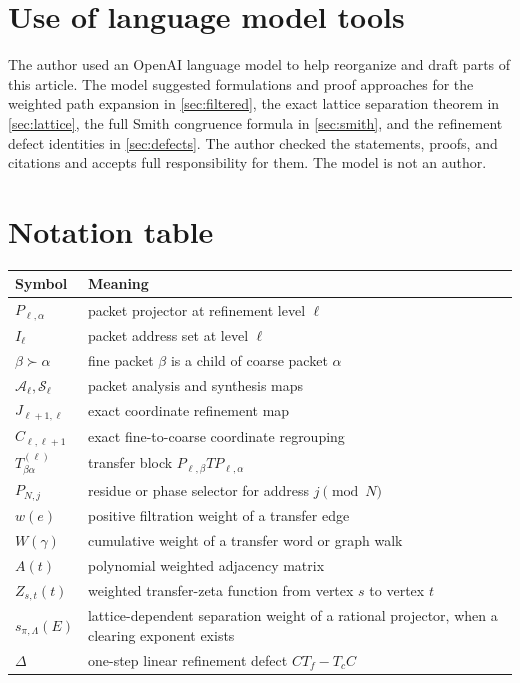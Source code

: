 \documentclass[11pt,a4paper]{article}
\theoremstyle{definition}
\theoremstyle{remark}
\providecommand{\cA}{\mathcal A}
\providecommand{\cS}{\mathcal S}
\theoremstyle{definition}\newtheorem{construction}[theorem]{Construction}\newtheorem{certificate}[theorem]{Numerical Certificate}
\theoremstyle{remark}\newtheorem{boundary}[theorem]{Boundary}
\begin{document}
\section*{Use of language model tools}

The author used an OpenAI language model to help reorganize and draft parts of this article.  The model suggested formulations and proof approaches for the weighted path expansion in \cref{sec:filtered}, the exact lattice separation theorem in \cref{sec:lattice}, the full Smith congruence formula in \cref{sec:smith}, and the refinement defect identities in \cref{sec:defects}.  The author checked the statements, proofs, and citations and accepts full responsibility for them.  The model is not an author.


\appendix
\section{Notation table}

\begin{longtable}{L{0.28\textwidth}L{0.64\textwidth}}
\toprule
Symbol & Meaning \\
\midrule
\endhead
$P_{\ell,\alpha}$ & packet projector at refinement level $\ell$ \\
$I_\ell$ & packet address set at level $\ell$ \\
$\beta\succ\alpha$ & fine packet $\beta$ is a child of coarse packet $\alpha$ \\
$\cA_\ell,\cS_\ell$ & packet analysis and synthesis maps \\
$J_{\ell+1,\ell}$ & exact coordinate refinement map \\
$C_{\ell,\ell+1}$ & exact fine-to-coarse coordinate regrouping \\
$T^{(\ell)}_{\beta\alpha}$ & transfer block $P_{\ell,\beta}TP_{\ell,\alpha}$ \\
$P_{N,j}$ & residue or phase selector for address $j\pmod N$ \\
$w(e)$ & positive filtration weight of a transfer edge \\
$W(\gamma)$ & cumulative weight of a transfer word or graph walk \\
$A(t)$ & polynomial weighted adjacency matrix \\
$Z_{s,t}(t)$ & weighted transfer-zeta function from vertex $s$ to vertex $t$ \\
$s_{\pi,\Lambda}(E)$ & lattice-dependent separation weight of a rational projector, when a clearing exponent exists \\
$\Delta$ & one-step linear refinement defect $CT_f-T_cC$ \\
\bottomrule
\end{longtable}
\end{document}

